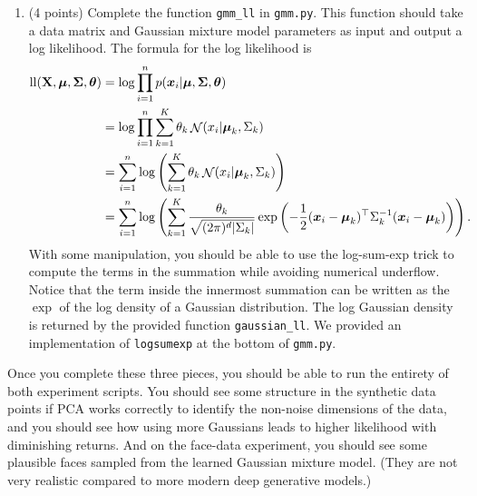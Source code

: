 \documentclass[10pt]{article}
\newcommand{\bx}{{\boldsymbol x}}
\newcommand{\bX}{\mathbf {X}}
\newcommand{\bmu}{{\boldsymbol \mu}}
\newcommand{\bSigma}{{\boldsymbol \Sigma}}
\newcommand{\btheta}{{\boldsymbol \theta}}
\DeclareMathOperator*{\normal}{{\cal N}}
\begin{document}
\begin{enumerate}
\item (4 points) Complete the function \texttt{gmm\_ll} in \texttt{gmm.py}. This function should take a data matrix and Gaussian mixture model parameters as input and output a log likelihood. The formula for the log likelihood is
\begin{equation}
\begin{aligned}
\mathrm{ll}(\bX, \bmu, \bSigma, \btheta) &= \log \prod_{i=1}^n p(\bx_i | \bmu, \bSigma, \btheta)\\
&= \log \prod_{i=1}^n \sum_{k = 1}^K \theta_k \normal(x_i | \bmu_k, \Sigma_k)\\
&=  \sum_{i=1}^n \log \left(\sum_{k = 1}^K \theta_k \normal(x_i | \bmu_k, \Sigma_k) \right)\\
&=  \sum_{i=1}^n \log \left(\sum_{k = 1}^K  \frac{\theta_k}{\sqrt{(2\pi)^d|\Sigma_k|}} \exp\left(- \frac{1}{2} (\bx_i - \bmu_k)^\top \Sigma_k^{-1} (\bx_i - \bmu_k)\right) \right).
\end{aligned}
\end{equation}
With some manipulation, you should be able to use the log-sum-exp trick to compute the terms in the summation while avoiding numerical underflow. Notice that the term inside the innermost summation can be written as the $\exp$ of the log density of a Gaussian distribution. The log Gaussian density is returned by the provided function \texttt{gaussian\_ll}.
We provided an implementation of \texttt{logsumexp} at the bottom of \texttt{gmm.py}.

\end{enumerate}

Once you complete these three pieces, you should be able to run the entirety of both experiment scripts. You should see some structure in the synthetic data points if PCA works correctly to identify the non-noise dimensions of the data, and you should see how using more Gaussians leads to higher likelihood with diminishing returns. And on the face-data experiment, you should see some plausible faces sampled from the learned Gaussian mixture model. (They are not very realistic compared to more modern deep generative models.)
\end{document}

